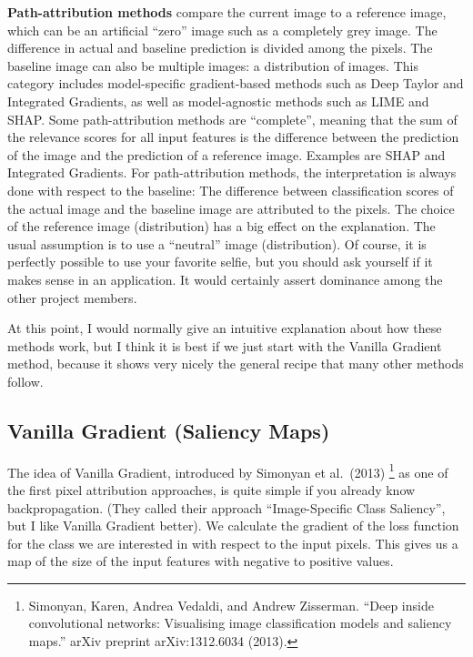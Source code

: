 \documentclass[
  11pt,
]{scrbook}
\begin{document}
\textbf{Path-attribution methods} compare the current image to a reference image, which can be an artificial ``zero'' image such as a completely grey image.
The difference in actual and baseline prediction is divided among the pixels.
The baseline image can also be multiple images: a distribution of images.
This category includes model-specific gradient-based methods such as Deep Taylor and Integrated Gradients, as well as model-agnostic methods such as LIME and SHAP.
Some path-attribution methods are ``complete'', meaning that the sum of the relevance scores for all input features is the difference between the prediction of the image and the prediction of a reference image.
Examples are SHAP and Integrated Gradients.
For path-attribution methods, the interpretation is always done with respect to the baseline:
The difference between classification scores of the actual image and the baseline image are attributed to the pixels.
The choice of the reference image (distribution) has a big effect on the explanation.
The usual assumption is to use a ``neutral'' image (distribution).
Of course, it is perfectly possible to use your favorite selfie, but you should ask yourself if it makes sense in an application.
It would certainly assert dominance among the other project members.

At this point, I would normally give an intuitive explanation about how these methods work, but I think it is best if we just start with the Vanilla Gradient method, because it shows very nicely the general recipe that many other methods follow.

\hypertarget{vanilla-gradient-saliency-maps}{%
\subsection{Vanilla Gradient (Saliency Maps)}\label{vanilla-gradient-saliency-maps}}

The idea of Vanilla Gradient, introduced by Simonyan et al.~(2013) \footnote{Simonyan, Karen, Andrea Vedaldi, and Andrew Zisserman. ``Deep inside convolutional networks: Visualising image classification models and saliency maps.'' arXiv preprint arXiv:1312.6034 (2013).} as one of the first pixel attribution approaches, is quite simple if you already know backpropagation.
(They called their approach ``Image-Specific Class Saliency'', but I like Vanilla Gradient better).
We calculate the gradient of the loss function for the class we are interested in with respect to the input pixels.
This gives us a map of the size of the input features with negative to positive values.
\end{document}
